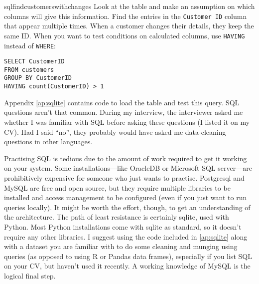 \begin{answer}{sqlfindcustomerswithchanges}
Look at the table and make an assumption on which columns will give this information.
Find the entries in the \verb+Customer ID+ column that appear multiple times.
When a customer changes their details, they keep the same ID.
When you want to test conditions on calculated columns, use
\verb+HAVING+
instead of
\verb+WHERE+:
\begin{verbatim}
SELECT CustomerID
FROM customers
GROUP BY CustomerID
HAVING count(CustomerID) > 1
\end{verbatim}
Appendix \ref{ap:sqlite} contains code to load the table and test this query.
SQL questions aren't that common.
During my interview, the interviewer asked me whether I was familiar with SQL before asking these questions (I listed it on my CV).
Had I said ``no'', they probably would have asked me data-cleaning questions in other languages.

Practising SQL is tedious due to the amount of work required to get it working on your system.
Some installations---like OracleDB or Microsoft SQL server---are prohibitively expensive for someone who just wants to practise.
Postgresql and MySQL are free and open source, but they require multiple libraries to be installed and access management to be configured (even if you just want to run queries locally).
It might be worth the effort, though, to get an understanding of the architecture.
The path of least resistance is certainly sqlite, used with Python.
Most Python installations come with sqlite as standard, so it doesn't require any other libraries.
I suggest using the code included in \ref{ap:sqlite} along with a dataset you are familiar with to do some cleaning and munging using queries (as opposed to using R or Pandas data frames), especially if you list SQL on your CV, but haven't used it recently.
A working knowledge of MySQL is the logical final step.
\end{answer}
